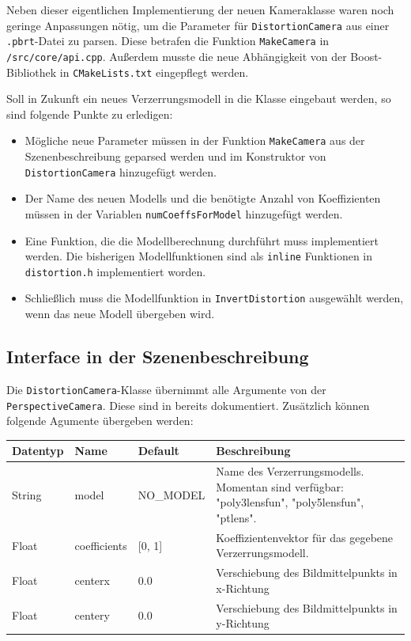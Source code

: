 Neben dieser eigentlichen Implementierung der neuen Kameraklasse waren noch geringe Anpassungen nötig, um die Parameter für \texttt{DistortionCamera} aus einer \texttt{.pbrt}-Datei zu parsen. Diese betrafen die Funktion \texttt{MakeCamera} in \texttt{/src/core/api.cpp}. Außerdem musste die neue Abhängigkeit von der Boost-Bibliothek in \texttt{CMakeLists.txt} eingepflegt werden.

Soll in Zukunft ein neues Verzerrungsmodell in die Klasse eingebaut werden, so sind folgende Punkte zu erledigen:
\begin{itemize}
	\item Mögliche neue Parameter müssen in der Funktion \texttt{MakeCamera} aus der Szenenbeschreibung geparsed werden und im Konstruktor von \texttt{DistortionCamera} hinzugefügt werden.
	\item Der Name des neuen Modells und die benötigte Anzahl von Koeffizienten müssen in der Variablen \texttt{numCoeffsForModel} hinzugefügt werden.
	\item Eine Funktion, die die Modellberechnung durchführt muss implementiert werden. Die bisherigen Modellfunktionen sind als \texttt{inline} Funktionen in \texttt{distortion.h} implementiert worden.
	\item Schließlich muss die Modellfunktion in \texttt{InvertDistortion} ausgewählt werden, wenn das neue Modell übergeben wird.
\end{itemize}

\subsection{Interface in der Szenenbeschreibung}

Die \texttt{DistortionCamera}-Klasse übernimmt alle Argumente von der \texttt{PerspectiveCamera}. Diese sind in \cite{pbrt_file} bereits dokumentiert. Zusätzlich können folgende Agumente übergeben werden:
\begin{table}[h]
	\begin{tabularx}{\textwidth}{l|l|l|X}
		\textbf{Datentyp} & \textbf{Name} & \textbf{Default} & \textbf{Beschreibung} \\ \hline \hline
		String & model & NO\_MODEL & Name des Verzerrungsmodells. Momentan sind verfügbar: "poly3lensfun", \mbox{"poly5lensfun"}, "ptlens".\\
		Float & coefficients & [0, 1] & Koeffizientenvektor für das gegebene Verzerrungsmodell. \\
		Float & centerx & 0.0 & Verschiebung des Bildmittelpunkts in \mbox{x-Richtung} \\
		Float & centery & 0.0 & Verschiebung des Bildmittelpunkts in \mbox{y-Richtung}
	\end{tabularx}
\end{table}